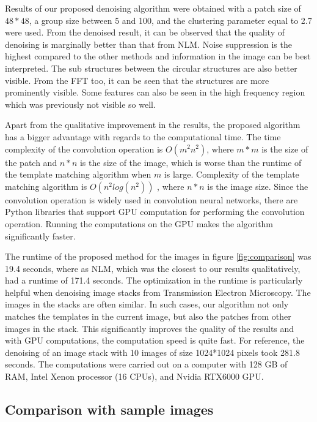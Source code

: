 \documentclass[fleqn,10pt]{wlscirep}
\begin{document}
	Results of our proposed denoising algorithm were obtained with a patch size of $48*48$, a group size between 5 and 100, and the clustering parameter equal to 2.7 were used. From the denoised result, it can be observed that the quality of denoising is marginally better than that from NLM. Noise suppression is the highest compared to the other methods and information in the image can be best interpreted. The sub structures between the circular structures are also better visible. From the FFT too, it can be seen that the structures are more prominently visible. Some features can also be seen in the high frequency region which was previously not visible so well.

	
	Apart from the qualitative improvement in the results, the proposed algorithm has a bigger advantage with regards to the computational time. The time complexity of the convolution operation is $O(m^2n^2)$, where $m*m$ is the size of the patch and $n*n$ is the size of the image, which is worse than the runtime of the template matching algorithm when $m$ is large. Complexity of the template matching algorithm is $O(n^2log(n^2))$ \cite{template_matching}, where $n*n$ is the image size. Since the convolution operation is widely used in convolution neural networks, there are Python libraries that support GPU computation for performing the convolution operation. Running the computations on the GPU makes the algorithm significantly faster.
	
	The runtime of the proposed method for the images in figure \ref{fig:comparison} was 19.4 seconds, where as NLM, which was the closest to our results qualitatively, had a runtime of 171.4 seconds. The optimization in the runtime is particularly helpful when denoising image stacks from Transmission Electron Microscopy. The images in the stacks are often similar. In such cases, our algorithm not only matches the templates in the current image, but also the patches from other images in the stack. This significantly improves the quality of the results and with GPU computations, the computation speed is quite fast. For reference, the denoising of an image stack with 10 images of size 1024*1024 pixels took 281.8 seconds. The computations were carried out on a computer with 128 GB of RAM, Intel Xenon processor (16 CPUs), and Nvidia RTX6000 GPU.
	

	

	
	\subsection*{Comparison with sample images}
	
\end{document}
